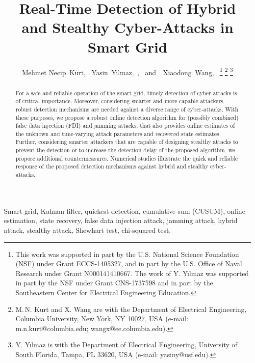 \documentclass[onecolumn]{IEEEtran}
\begin{document}
\title{Real-Time Detection of Hybrid and Stealthy Cyber-Attacks in Smart Grid}

\author{Mehmet Necip~Kurt,~
        Yasin~Y{\i}lmaz,~,~
        and~~Xiaodong~Wang,~%
\thanks{This work was supported in part by the U.S. National
Science Foundation (NSF) under Grant ECCS-1405327, and in part by the
U.S. Office of Naval Research under Grant N000141410667. The work of
Y. Y{\i}lmaz was supported in part by the NSF under Grant CNS-1737598 and
in part by the Southeastern Center for Electrical Engineering Education.}%
\thanks{M.\,N. Kurt and X. Wang are with the Department
of Electrical Engineering, Columbia University, New York, NY 10027, USA (e-mail: m.n.kurt@columbia.edu; wangx@ee.columbia.edu).}%
\thanks{Y. Y{\i}lmaz is with the Department of Electrical Engineering, University of South Florida, Tampa, FL 33620, USA (e-mail: yasiny@usf.edu).}\vspace{-2.5ex}}%


\maketitle


\begin{abstract}
For a safe and reliable operation of the smart grid, timely detection of cyber-attacks is of critical importance. Moreover, considering smarter and more capable attackers, robust detection mechanisms are needed against a diverse range of cyber-attacks. With these purposes, we propose a robust online detection algorithm for (possibly combined) false data injection (FDI) and jamming attacks, that also provides online estimates of the unknown and time-varying attack parameters and recovered state estimates. Further, considering smarter attackers that are capable of designing stealthy attacks to prevent the detection or to increase the detection delay of the proposed algorithm, we propose additional countermeasures. Numerical studies illustrate the quick and reliable response of the proposed detection mechanisms against hybrid and stealthy cyber-attacks. \vspace{-0.3cm}
\end{abstract}

\begin{keywords}
\noindent Smart grid, Kalman filter, quickest detection, cumulative sum (CUSUM), online estimation, state recovery, false data injection attack, jamming attack, hybrid attack, stealthy attack, Shewhart test, chi-squared test.
\end{keywords}
\end{document}
